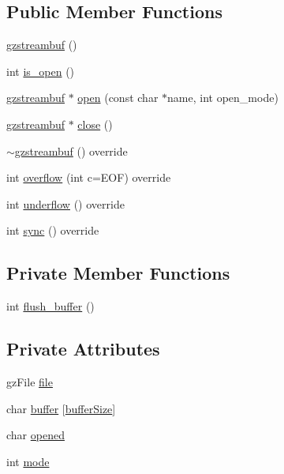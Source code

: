 \subsection*{Public Member Functions}
\begin{DoxyCompactItemize}
\item 
\hyperlink{classgzstreambuf_afa212e5c8f1ec6a63caec17e77d6b432}{gzstreambuf} ()
\item 
int \hyperlink{classgzstreambuf_a89e97aaae92b72d41c20223ed7e71308}{is\+\_\+open} ()
\item 
\hyperlink{classgzstreambuf}{gzstreambuf} $\ast$ \hyperlink{classgzstreambuf_af720bcd3058c97c90d11a3bcc57fda98}{open} (const char $\ast$name, int open\+\_\+mode)
\item 
\hyperlink{classgzstreambuf}{gzstreambuf} $\ast$ \hyperlink{classgzstreambuf_ac47e68029383ac04ded54dedae5c930d}{close} ()
\item 
\hyperlink{classgzstreambuf_a91aade68db7be79b082ebf291e5802e3}{$\sim$gzstreambuf} () override
\item 
int \hyperlink{classgzstreambuf_a3152b230147cdb768bf87cf4009963ff}{overflow} (int c=E\+OF) override
\item 
int \hyperlink{classgzstreambuf_a83b34ca4fc77dcebfb5152bbbb6b5652}{underflow} () override
\item 
int \hyperlink{classgzstreambuf_afec93b74f334978be8a0e9bd0ec6eee6}{sync} () override
\end{DoxyCompactItemize}
\subsection*{Private Member Functions}
\begin{DoxyCompactItemize}
\item 
int \hyperlink{classgzstreambuf_a1f5ae8e8283961711376c1dbbaa1ee75}{flush\+\_\+buffer} ()
\end{DoxyCompactItemize}
\subsection*{Private Attributes}
\begin{DoxyCompactItemize}
\item 
gz\+File \hyperlink{classgzstreambuf_a9518df5885cfa63af6ba3496f7946d5f}{file}
\item 
char \hyperlink{classgzstreambuf_afea1535417524acb188dc4390d918269}{buffer} \mbox{[}\hyperlink{classgzstreambuf_a46652e438b6c4e9174ca79c171b1a140}{buffer\+Size}\mbox{]}
\item 
char \hyperlink{classgzstreambuf_a233a824915fa1a54df05ecf33b8b78d2}{opened}
\item 
int \hyperlink{classgzstreambuf_adddc98d7ed861e936f47fdd9d4a137f7}{mode}
\end{DoxyCompactItemize}
